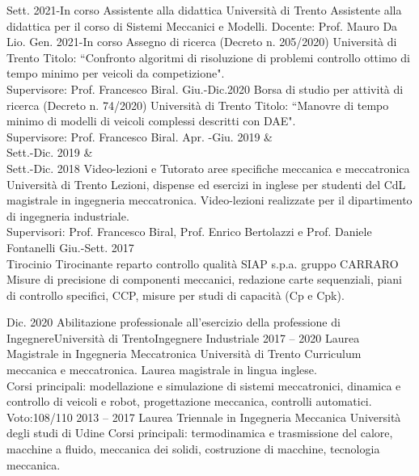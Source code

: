\documentclass[9pt]{developercv} %
\begin{document}
%
\begin{entrylist}
	\entry
		{Sett. 2021-In corso}
		{Assistente alla didattica}
		{Università di Trento}
		{Assistente alla didattica per il corso di Sistemi Meccanici e Modelli. Docente: Prof. Mauro Da Lio.}
	\entry
		{Gen. 2021-In corso}
		{Assegno di ricerca (Decreto n. 205/2020)}
		{Università di Trento}
		{Titolo: “Confronto algoritmi di risoluzione di problemi controllo ottimo di tempo minimo per veicoli da competizione". \\
		Supervisore: Prof. Francesco Biral.}
	\entry
		{Giu.-Dic.2020}
		{Borsa di studio per attività di ricerca (Decreto n. 74/2020)}
		{Università di Trento}
		{Titolo: “Manovre di tempo minimo di modelli di veicoli complessi descritti con DAE".\\
		Supervisore: Prof. Francesco Biral.}
	\entry
		{Apr. -Giu. 2019 \&\\Sett.-Dic. 2019 \&\\Sett.-Dic. 2018}
		{Video-lezioni e Tutorato aree specifiche meccanica e meccatronica}
		{Università di Trento}
		{Lezioni, dispense ed esercizi in inglese per studenti del CdL magistrale in ingegneria meccatronica. Video-lezioni realizzate per il dipartimento di ingegneria industriale.\\
		Supervisori: Prof. Francesco Biral, Prof. Enrico Bertolazzi e Prof. Daniele Fontanelli}
	\entry
		{Giu.-Sett. 2017\\\footnotesize{Tirocinio}}
		{Tirocinante reparto controllo qualità}
		{SIAP s.p.a. gruppo CARRARO}
		{Misure di precisione di componenti meccanici, redazione carte sequenziali, piani di controllo specifici, CCP, misure per studi di capacità (Cp e Cpk).
		}
\end{entrylist}
%
%
%
\begin{entrylist}
	\entry
		{Dic. 2020}
		{Abilitazione professionale all'esercizio della professione di Ingegnere}{Università di Trento}{Ingegnere Industriale}
	\entry
		{2017 -- 2020}
		{Laurea Magistrale in Ingegneria Meccatronica}
		{Università di Trento}
		{Curriculum meccanica e meccatronica. Laurea magistrale in lingua inglese.\\
		Corsi principali: modellazione e simulazione di sistemi meccatronici, dinamica e controllo di veicoli e robot, progettazione meccanica, controlli automatici.
		\hfill Voto:108/110} 
	\entry
		{2013 -- 2017}
		{Laurea Triennale in Ingegneria Meccanica}
		{Università degli studi di Udine}
		{Corsi principali: termodinamica e trasmissione del calore,  macchine a fluido, meccanica dei solidi, costruzione di macchine, tecnologia meccanica.} %
\end{entrylist}
\end{document}
